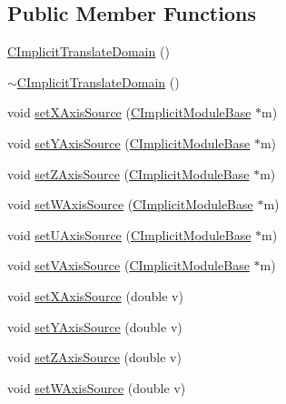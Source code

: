 \subsection*{Public Member Functions}
\begin{DoxyCompactItemize}
\item 
\hyperlink{classanl_1_1CImplicitTranslateDomain_a64f7f00d122cf708c20c54878aa184e1}{CImplicitTranslateDomain} ()
\item 
\hyperlink{classanl_1_1CImplicitTranslateDomain_ae044feefa28a115068091303b7328d58}{$\sim$CImplicitTranslateDomain} ()
\item 
void \hyperlink{classanl_1_1CImplicitTranslateDomain_afcec802af7d592ad8d4857db58a2ee05}{setXAxisSource} (\hyperlink{classanl_1_1CImplicitModuleBase}{CImplicitModuleBase} $\ast$m)
\item 
void \hyperlink{classanl_1_1CImplicitTranslateDomain_afc1d80f04ed101a3a1d80482490f3fd6}{setYAxisSource} (\hyperlink{classanl_1_1CImplicitModuleBase}{CImplicitModuleBase} $\ast$m)
\item 
void \hyperlink{classanl_1_1CImplicitTranslateDomain_a86e353f20809847a3ff1c663643925e9}{setZAxisSource} (\hyperlink{classanl_1_1CImplicitModuleBase}{CImplicitModuleBase} $\ast$m)
\item 
void \hyperlink{classanl_1_1CImplicitTranslateDomain_ac834b7b2164fb488b159015c478d7c2b}{setWAxisSource} (\hyperlink{classanl_1_1CImplicitModuleBase}{CImplicitModuleBase} $\ast$m)
\item 
void \hyperlink{classanl_1_1CImplicitTranslateDomain_adb76061648e6d25c567b7bcf2da81869}{setUAxisSource} (\hyperlink{classanl_1_1CImplicitModuleBase}{CImplicitModuleBase} $\ast$m)
\item 
void \hyperlink{classanl_1_1CImplicitTranslateDomain_ab034bbff48e9b745f9cef9ca4c00ad59}{setVAxisSource} (\hyperlink{classanl_1_1CImplicitModuleBase}{CImplicitModuleBase} $\ast$m)
\item 
void \hyperlink{classanl_1_1CImplicitTranslateDomain_a7fdc43419fae7a3b06e4300d6f42eb56}{setXAxisSource} (double v)
\item 
void \hyperlink{classanl_1_1CImplicitTranslateDomain_a680081eb635da849e969dfe20ea3c2b2}{setYAxisSource} (double v)
\item 
void \hyperlink{classanl_1_1CImplicitTranslateDomain_aba8ba496883031816d86f34d34ba4681}{setZAxisSource} (double v)
\item 
void \hyperlink{classanl_1_1CImplicitTranslateDomain_a522576d3aad43fcfb80a877a3208866e}{setWAxisSource} (double v)
\item 

\end{DoxyCompactItemize}
